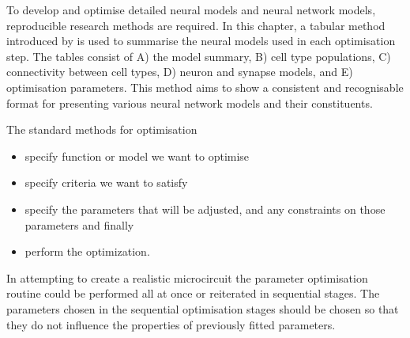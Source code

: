
To develop and optimise detailed neural models and neural network models,
reproducible research methods are required. In this chapter, a tabular
method introduced by \citet{NordlieGewaltigEtAl:2009} is used to summarise the neural
models used in each optimisation step. The tables consist of A) the model
summary, B) cell type populations, C) connectivity between cell types, D) neuron
and synapse models, and E) optimisation parameters.  This method aims to show a
consistent and recognisable format for presenting various neural network models
and their constituents. 

The standard methods for optimisation \begin{itemize}
\item specify function or model we want to optimise
\item specify criteria we want to satisfy
\item specify the parameters that will be adjusted, 
    and any constraints on those parameters and finally
\item perform the optimization.
\end{itemize}
In attempting to create a realistic microcircuit the parameter optimisation
routine could be performed all at once or reiterated in sequential stages. The
parameters chosen in the sequential optimisation stages should be chosen so that
they do not influence the properties of previously fitted parameters.



